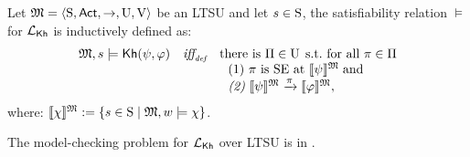     \begin{definition} \label{def:semantics-kh-uncertain}
        Let $\model = \tup{\S,\Act,\ra,\Unc,\V}$ be an LTSU and let $s\in\S$, the satisfiability relation $\models$ for $\Khlogic$ is inductively defined as:
        \[
        \begin{array}{l@{\ \ \ }c@{\ \ \  }l}
        \model, s \models \kh(\psi,\varphi) & \iffdef & \text{there is } \plans \in \Unc \;\text{s.t.\ for all } \plan\in\plans \\
        & & \ \ \text{\rm (1)} \ \plan \text{ is SE at }  \truthset{\model}{\psi}\; \text{and} \\
        & & \ \ \text{\em (2)} \ \truthset{\model}{\psi} \reach{\plan} \truthset{\model}{\varphi}, 
        \end{array}
        \]      where: $\truthset{\model}{\chi} := \csetsc{s\in\S}{\model,w\models\chi}$. 
    \end{definition}

    \begin{proposition}
        The model-checking problem for $\Khlogic$ over LTSU is in \PTIME.
    \end{proposition}
